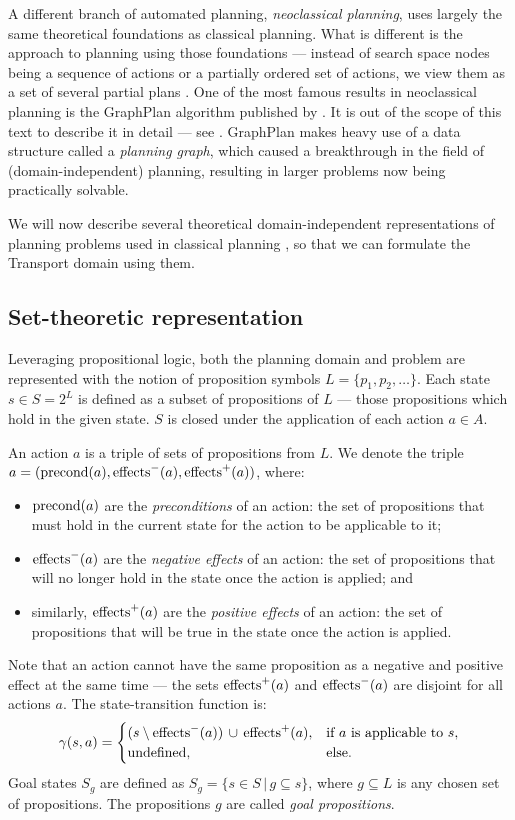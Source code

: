 A different branch of automated planning, \textit{neoclassical planning},
uses largely the same theoretical foundations as classical 
planning. What is different is the approach to planning using those foundations
--- instead of search space nodes being a sequence of actions or a partially ordered
set of actions, we view them as a set of several partial plans
\citep[Part~II]{Ghallab2004}.
One of the most famous results in neoclassical planning is the GraphPlan algorithm
published by \citet{Blum1997}. It is out of the scope of this text to describe it in detail
--- see \citet[Section~6.3]{Ghallab2004}.
GraphPlan makes heavy use of a data structure called a \textit{planning graph},
which caused a breakthrough in the field of (domain-independent) planning,
resulting in larger problems now being practically solvable.

We will now describe several theoretical domain-independent representations
of planning problems used in classical planning \citep[Chapter~2]{Ghallab2004},
so that we can formulate the Transport domain using them.

\subsection{Set-theoretic representation}

Leveraging propositional logic, both the planning domain and problem
are represented with the notion
of proposition symbols $L = \{p_1, p_2, \ldots\}$.
Each state $s \in S = 2^L$ is defined as a subset of propositions of $L$ --- those propositions
which hold in the given state. $S$ is closed under the application of each
action $a \in A$.

An action $a$
is a triple of sets of propositions from $L$.
We denote the triple $a = (\operatorname{\textrm{precond}}(a), \operatorname{\textrm{effects}}^-(a), \operatorname{\textrm{effects}}^+(a))$, where:
\begin{itemize}
\item $\operatorname{\textrm{precond}}(a)$ are the \textit{preconditions} of an action: the set of
propositions that must hold in the current state for the action to be applicable to it;
\item $\operatorname{\textrm{effects}}^-(a)$ are the \textit{negative effects} of an action:
the set of propositions
that will no longer hold in the state once the action is applied; and
\item similarly, $\operatorname{\textrm{effects}}^+(a)$ are the \textit{positive effects} of an action:
the set of propositions that will be true in the state once the action is applied.
\end{itemize}
Note that an action cannot have the same proposition as a negative and positive effect at the same time --- the sets $\operatorname{\textrm{effects}}^+(a)$ and $\operatorname{\textrm{effects}}^-(a)$ are disjoint for all actions $a$.
The state-transition function is:
$$\gamma(s, a) = 
\begin{cases}
(s \setminus \operatorname{\textrm{effects}}^-(a)) \,\cup\,
\operatorname{\textrm{effects}}^+(a), &  \textrm{if } a \textrm{ is applicable to } s,\\
\textrm{undefined}, & \textrm{else.}
\end{cases}$$
Goal states $S_g$ are defined as
$S_g = \{s \in S \,|\, g \subseteq s\}$, where
$g \subseteq L$ is any chosen set of propositions. The propositions $g$ are called
\textit{goal propositions}.

